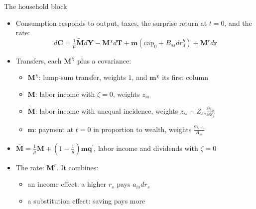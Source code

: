 \documentclass[10pt,english]{beamer}
\begin{document}
%
\begin{frame}{The household block}
\begin{itemize}
\item <+->Consumption responds to output, taxes, the surprise return at $t=0$, and the rate:
\[
d\boldsymbol{C}=\tfrac{1}{\mu}\tilde{\boldsymbol{M}}d\boldsymbol{Y}-\boldsymbol{M}^{\chi}d\boldsymbol{T}+\boldsymbol{m}\left(\text{cap}_{0}+B_{ss}dr_{0}^{b}\right)+\boldsymbol{M}^{r}d\boldsymbol{r}
\]
\item <+->Transfers, each $\boldsymbol{M}^{\chi}$ plus a covariance:
\begin{itemize}
\item $\boldsymbol{M}^{\chi}$: lump-sum transfer, weights $1$, and $\boldsymbol{m}^{\chi}$ its first column
\item $\boldsymbol{M}$: labor income with $\zeta=0$, weights $z_{is}$
\item $\tilde{\boldsymbol{M}}$: labor income with unequal incidence, weights $z_{is}+Z_{ss}\frac{\partial z_{is}}{\partial Z_{s}}$
\item $\boldsymbol{m}$: payment at $t=0$ in proportion to wealth, weights $\frac{a_{i,-1}}{A_{ss}}$
\end{itemize}
\item $\bar{\boldsymbol{M}}=\frac{1}{\mu}\boldsymbol{M}+\left(1-\frac{1}{\mu}\right)\boldsymbol{m}\boldsymbol{q}^{\prime}$, labor income and dividends with $\zeta=0$
\item The rate: $\boldsymbol{M}^{r}$. It combines:
\begin{itemize}
\item an income effect: a higher $r_{s}$ pays $a_{is}dr_{s}$
\item a substitution effect: saving pays more
\end{itemize}
\end{itemize}
\end{frame}
%
\end{document}
